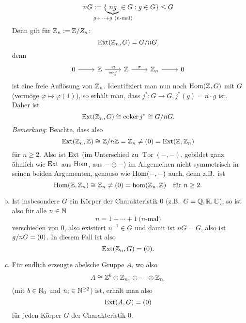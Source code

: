 \begin{beispiel}
\begin{enumerate}[(a)]
      \begin{equation*}
        n G := \{ \underset{\mathclap{g+\dotsb+g \ (\text{$n$-mal})}}{\underbrace{ng}} \in G : g \in G \} \leq G
      \end{equation*}
      Denn gilt für $\mathbb{Z}_n := \mathbb{Z} / {Z_n}$:
      \begin{equation*}
        \mathrm{Ext}(\mathbb{Z}_n, G) = G/{nG},
      \end{equation*}
      denn
      \begin{equation*}
        \begin{tikzcd}
          0 \arrow{r}{} & \Z \arrow{r}{\cdot n}[swap]{=:j}  & \Z \arrow{r}{\pi} & \Z_n \arrow{r}{}  & 0
        \end{tikzcd}
      \end{equation*}
      ist eine freie Auflösung von $\mathbb{Z}_n$.
      Identifiziert man nun noch $\mathrm{Hom}(\mathbb{Z},G)$ mit $G$ (vermöge $\varphi \mapsto \varphi(1)$), so erhält man, dass $j^*\colon G \to G, j^*(g) = n \cdot g$ ist.
      Daher ist
      \begin{equation*}
        \mathrm{Ext}(\mathbb{Z}_n,G) \cong \operatorname{coker} j^* \cong G/{nG}.
      \end{equation*}
      \emph{Bemerkung}: Beachte, dass also
      \begin{equation*}
        \mathrm{Ext}(\mathbb{Z}_n,\mathbb{Z}) \cong \mathbb{Z}/{n\mathbb{Z}} = \mathbb{Z}_n \neq (0) = \mathrm{Ext}(\mathbb{Z},\mathbb{Z}_n)
      \end{equation*}
      für $n \ge 2$.
      Also ist $\mathrm{Ext}$ (im Unterschied zu $\operatorname{Tor}(-,-)$, gebildet ganz ähnlich wie $\mathrm{Ext}$ aus $\mathrm{Hom}$, aus $-\oplus-$) im Allgemeinen nicht symmetrisch in seinen beiden Argumenten, genauso wie $\mathrm{Hom}(-,-)$ auch, denn z.B.\ ist
      \begin{equation*}
        \mathrm{Hom}(\mathbb{Z},\mathbb{Z}_n) \cong \mathbb{Z}_n \neq (0) = \hom(\mathbb{Z}_n,\mathbb{Z}) \quad \text{für $n\geq 2$}.
      \end{equation*}
    \item
      Ist insbesondere $G$ ein Körper der Charakteristik 0 (z.B.\ $G = \mathbb{Q},\mathbb{R},\mathbb{C}$), so ist also für alle $n \in \mathbb{N}$
      \begin{equation*}
        n = 1 + \dotsb + 1 \ \text{($n$-mal)}
      \end{equation*}
      verschieden von $0$, also existiert $n^{-1} \in G$ und damit ist $nG = G$, also ist $g/{nG} = (0)$.
      In diesem Fall ist also
      \begin{equation*}
        \mathrm{Ext}(\mathbb{Z}_n,G) = (0).
      \end{equation*}
    \item
      Für endlich erzeugte abelsche Gruppe $A$, wo also
      \begin{equation*}
        A \cong \mathbb{Z}^b \oplus \mathbb{Z}_{n_1} \oplus \dotsb \oplus \mathbb{Z}_{n_r}
      \end{equation*}
    (mit $b \in \mathbb{N}_0$ und $n_i \in \mathbb{N}^{\ge 2}$) ist, erhält man also
    \begin{equation*}
      \mathrm{Ext}(A,G) = (0)
    \end{equation*}
    für jeden Körper $G$ der Charakteristik 0.
  \end{enumerate}
\end{beispiel}
